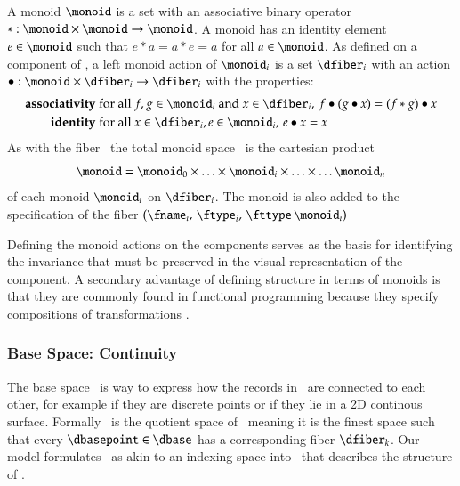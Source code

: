 \documentclass[journal]{vgtc}                %
\begin{document}
A monoid \cite{Monoid2021} $\monoid$ is a set with an associative binary operator $\ast:\monoid \times \monoid\rightarrow \monoid$. A monoid has an identity element $e\in \monoid$ such that $e\ast a= a \ast e = a$ for all $a \in \monoid$. As defined on a component of \dfiber, a left monoid action \cite{SemigroupAction2021,nlab:action} of $\monoid_i$ is a set $\dfiber_i$ with an action $\bullet: \monoid\times \dfiber_i \rightarrow \dfiber_i$ with the properties:
\begin{align*}
    \textbf{associativity}\;& \text{for all } f,g \in \monoid_i \text{ and } x\in \dfiber_i,\, f\bullet(g\bullet x) = (f\ast g) \bullet x\\
    \textbf{identity}\;& \text{for all } x\in \dfiber_i, e\in \monoid_i,\,  e\bullet x = x 
\end{align*}
As with the fiber \dfiber\, the total monoid space \monoid\ is the cartesian product
\begin{equation}
\monoid= \monoid_{0} \times \ldots \times \monoid_{i}\times \ldots \times\ldots \monoid_{n}
\end{equation}
of each monoid $\monoid_{i}$ on $\dfiber_{i}$.  The monoid is also added to the specification of the fiber $(\fname_i,\, \ftype_i,\, \fttype\, \monoid_i)$

Defining the monoid actions on the components serves as the basis for identifying the invariance\cite{kindlmannAlgebraicProcessVisualization2014} that must be preserved in the visual representation of the component. A secondary advantage of defining structure in terms of monoids is that they are commonly found in functional programming because they specify compositions of transformations \cite{yorgeyMonoidsThemeVariations, stievenMonadJustMonoid2020}.

\subsubsection{Base Space: Continuity}
\label{sec:math:data:base}
 The base space \dbase\ is way to express how the records in \dtotal\ are connected to each other, for example if they are discrete points or if they lie in a 2D continous surface. Formally \dbase\ is the quotient space of \dtotal\, meaning it is the finest space\cite{aurouxMath131Introduction} such that every $\dbasepoint \in \dbase$ has a corresponding fiber $\dfiber_k$\cite{QuotientSpaceTopology2020}. Our model formulates \dbase\ as akin to an indexing space into \dtotal\ that describes the structure of \dtotal.  
 
\end{document}
